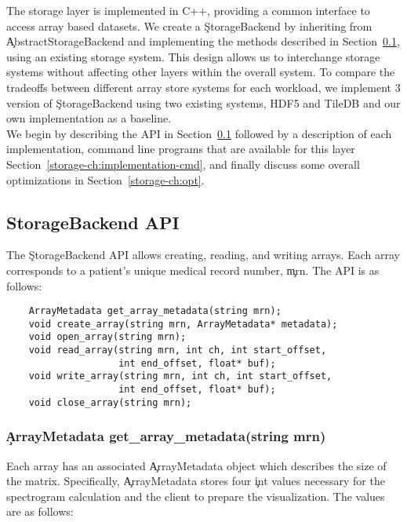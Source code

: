 The storage layer is implemented in C++, providing a common interface to access
array based datasets. We create a \c{StorageBackend} by inheriting from
\c{AbstractStorageBackend} and implementing the methods described in
Section~\ref{storage-ch:api}, using an existing storage system. This design
allows us to interchange storage systems without affecting other layers within
the overall system. To compare the tradeoffs between different array store
systems for each workload, we implement 3 version of \c{StorageBackend} using
two existing systems, HDF5 \cite{hdf5} and TileDB \cite{tiledb} and our own
implementation as a baseline. \\

We begin by describing the API in Section~\ref{storage-ch:api} followed by a
description of each implementation, command line programs that are available
for this layer Section~\ref{storage-ch:implementation-cmd}, and finally discuss
some overall optimizations in Section~\ref{storage-ch:opt}.

\subsection{StorageBackend API}\label{storage-ch:api}

The \c{StorageBackend} API allows creating, reading, and writing arrays. Each
array corresponds to a patient's unique medical record number, \c{mrn}. The API
is as follows:

\begin{lstlisting}
    ArrayMetadata get_array_metadata(string mrn);
    void create_array(string mrn, ArrayMetadata* metadata);
    void open_array(string mrn);
    void read_array(string mrn, int ch, int start_offset,
                    int end_offset, float* buf);
    void write_array(string mrn, int ch, int start_offset,
                    int end_offset, float* buf);
    void close_array(string mrn);
\end{lstlisting}

\subsubsection{\c{ArrayMetadata get\_array\_metadata(string mrn)}} Each array
has an associated \c{ArrayMetadata} object which describes the size of the
matrix. Specifically, \c{ArrayMetadata} stores four \c{int} values necessary
for the spectrogram calculation and the client to prepare the
visualization. The values are as follows:

